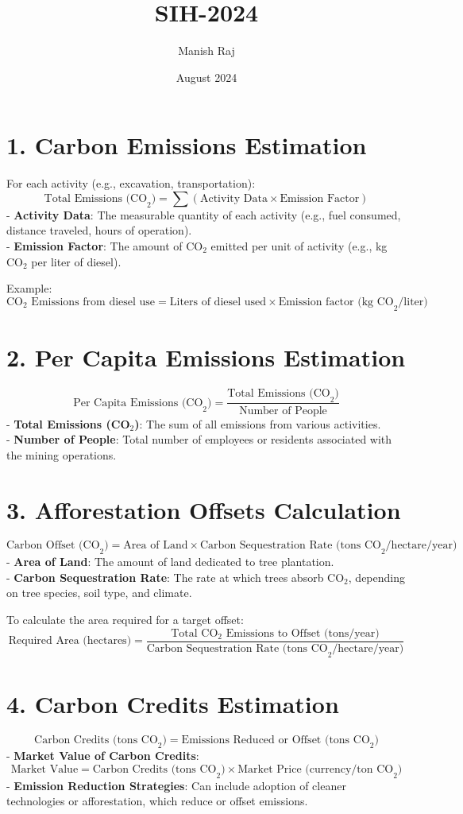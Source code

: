 \documentclass{article}
\title{SIH-2024}
\author{Manish Raj}
\date{August 2024}
\begin{document}
\maketitle

\section*{1. Carbon Emissions Estimation}
For each activity (e.g., excavation, transportation):
\[
\text{Total Emissions (CO}_2\text{)} = \sum (\text{Activity Data} \times \text{Emission Factor})
\]
- \textbf{Activity Data}: The measurable quantity of each activity (e.g., fuel consumed, distance traveled, hours of operation). \\
- \textbf{Emission Factor}: The amount of CO$_2$ emitted per unit of activity (e.g., kg CO$_2$ per liter of diesel).

Example:
\[
\text{CO}_2\text{ Emissions from diesel use} = \text{Liters of diesel used} \times \text{Emission factor (kg CO}_2/\text{liter})
\]

\section*{2. Per Capita Emissions Estimation}
\[
\text{Per Capita Emissions (CO}_2\text{)} = \frac{\text{Total Emissions (CO}_2\text{)}}{\text{Number of People}}
\]
- \textbf{Total Emissions (CO$_2$)}: The sum of all emissions from various activities. \\
- \textbf{Number of People}: Total number of employees or residents associated with the mining operations.

\section*{3. Afforestation Offsets Calculation}
\[
\text{Carbon Offset (CO}_2\text{)} = \text{Area of Land} \times \text{Carbon Sequestration Rate (tons CO}_2/\text{hectare/year})
\]
- \textbf{Area of Land}: The amount of land dedicated to tree plantation. \\
- \textbf{Carbon Sequestration Rate}: The rate at which trees absorb CO$_2$, depending on tree species, soil type, and climate.

To calculate the area required for a target offset:
\[
\text{Required Area (hectares)} = \frac{\text{Total CO}_2\text{ Emissions to Offset (tons/year)}}{\text{Carbon Sequestration Rate (tons CO}_2/\text{hectare/year})}
\]

\section*{4. Carbon Credits Estimation}
\[
\text{Carbon Credits (tons CO}_2\text{)} = \text{Emissions Reduced or Offset (tons CO}_2\text{)}
\]
- \textbf{Market Value of Carbon Credits}:
\[
\text{Market Value} = \text{Carbon Credits (tons CO}_2\text{)} \times \text{Market Price (currency/ton CO}_2\text{)}
\]
- \textbf{Emission Reduction Strategies}: Can include adoption of cleaner technologies or afforestation, which reduce or offset emissions.
\end{document}
